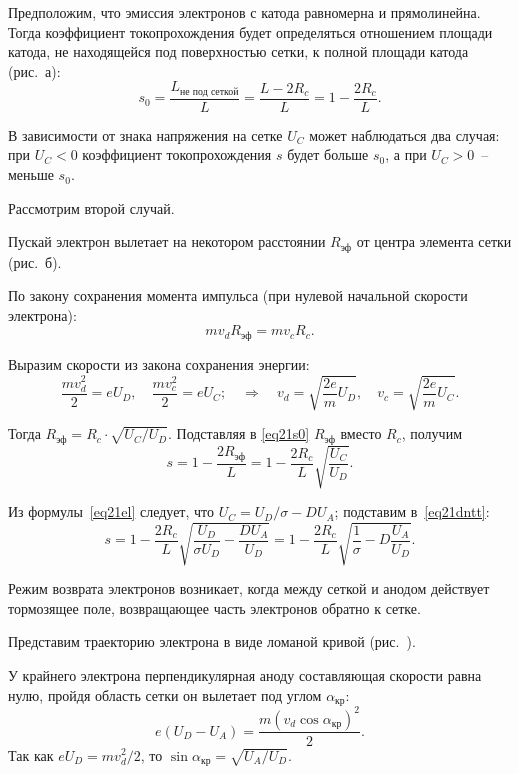 Предположим, что эмиссия электронов с катода равномерна и прямолинейна.
Тогда коэффициент токопрохождения будет определяться отношением площади катода, не
находящейся под поверхностью сетки, к полной площади катода (рис.~а):
\begin{equation}
  s_0 = \frac{L_\text{не под сеткой}}{L} = \frac{L - 2 R_c}{L} =
    1 - \frac{2 R_c}{L}.
  \label{eq21s0}
\end{equation}

В зависимости от знака напряжения на сетке \( U_C \) может наблюдаться
два случая: при \( U_C < 0 \) коэффициент токопрохождения \( s \) будет больше
\( s_0 \), а при \( U_C > 0 \)~-- меньше \( s_0 \).

Рассмотрим второй случай.

Пускай электрон вылетает на некотором расстоянии \( R_\text{эф} \) от центра
элемента сетки (рис.~б).

По закону сохранения момента импульса (при нулевой начальной скорости
электрона):
\[
  m v_d R_\text{эф} = m v_c R_c.
\]

Выразим скорости из закона сохранения энергии:
\[
  \frac{m v_d^2}{2} = e U_D, \quad \frac{m v_c^2}{2} = e U_C; \quad \Rightarrow
    \quad v_d = \sqrt{\frac{2 e}{m} U_D}, \quad v_c = \sqrt{\frac{2 e}{m} U_C}.
\]

Тогда \( R_\text{эф} = R_c \cdot \sqrt{U_C / U_D} \). Подставляя в \eqref{eq21s0}
\( R_\text{эф} \) вместо \( R_c \), получим
\begin{equation}
  s = 1 - \frac{2 R_\text{эф}}{L} = 1 - \frac{2 R_c}{L} \sqrt{\frac{U_C}{U_D}}.
  \label{eq21dntt}
\end{equation}

Из формулы~\eqref{eq21el} следует, что \( U_C = U_D / \sigma - D U_A \); подставим
в~\eqref{eq21dntt}:
\[
  s = 1 - \frac{2 R_c}{L} \sqrt{\frac{U_D}{\sigma U_D} - \frac{D U_A}{U_D}} =
    1 - \frac{2 R_c}{L} \sqrt{\frac{1}{\sigma} - D \frac{U_A}{U_D}}.
\]


Режим возврата электронов возникает, когда между сеткой и анодом действует
тормозящее поле, возвращающее часть электронов обратно к сетке.

Представим траекторию электрона в виде ломаной кривой (рис.~).

У крайнего электрона перпендикулярная аноду составляющая скорости равна нулю,
пройдя область сетки он вылетает под углом \( \alpha_\text{кр} \):
\[
  e (U_D - U_A) = \frac{m (v_d \cos\alpha_\text{кр})^2}{2}.
\]
Так как \( e U_D = m v_d^2 / 2 \), то
\( \sin\alpha_\text{кр} = \sqrt{U_A / U_D} \).

